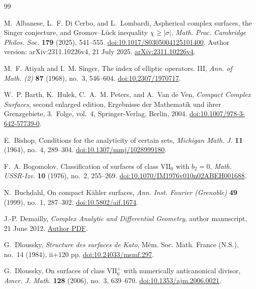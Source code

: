 \begin{thebibliography}{99}

M.~Albanese, L.~F. Di Cerbo, and L.~Lombardi,
Aspherical complex surfaces, the Singer conjecture, and Gromov--L\"uck
inequality $\chi\geq|\sigma|$,
\emph{Math. Proc. Cambridge Philos. Soc.} \textbf{179} (2025), 541--555.
\href{https://doi.org/10.1017/S0305004125101400}{doi:10.1017/S0305004125101400}.
Author version: arXiv:2311.10226v4, 21 July 2025.
\href{https://arxiv.org/abs/2311.10226v4}{arXiv:2311.10226v4}.

M.~F. Atiyah and I.~M. Singer, The index of elliptic operators. III,
\emph{Ann. of Math. (2)} \textbf{87} (1968), no.~3, 546--604.
\href{https://doi.org/10.2307/1970717}{doi:10.2307/1970717}.

W.~P. Barth, K.~Hulek, C.~A.~M. Peters, and A.~Van de Ven,
\emph{Compact Complex Surfaces}, second enlarged edition,
Ergebnisse der Mathematik und ihrer Grenzgebiete, 3.~Folge, vol.~4,
Springer-Verlag, Berlin, 2004.
\href{https://doi.org/10.1007/978-3-642-57739-0}{doi:10.1007/978-3-642-57739-0}.

E.~Bishop, Conditions for the analyticity of certain sets,
\emph{Michigan Math. J.} \textbf{11} (1964), no.~4, 289--304.
\href{https://doi.org/10.1307/mmj/1028999180}{doi:10.1307/mmj/1028999180}.

F.~A. Bogomolov, Classification of surfaces of class $\mathrm{VII}_0$
with $b_2=0$, \emph{Math. USSR-Izv.} \textbf{10} (1976), no.~2, 255--269.
\href{https://doi.org/10.1070/IM1976v010n02ABEH001688}{doi:10.1070/IM1976v010n02ABEH001688}.

N.~Buchdahl, On compact K\"ahler surfaces,
\emph{Ann. Inst. Fourier (Grenoble)} \textbf{49} (1999), no.~1, 287--302.
\href{https://doi.org/10.5802/aif.1674}{doi:10.5802/aif.1674}.

J.-P. Demailly, \emph{Complex Analytic and Differential Geometry},
author manuscript, 21 June 2012.
\href{https://www-fourier.univ-grenoble-alpes.fr/~demailly/manuscripts/agbook.pdf}{Author PDF}.

G.~Dloussky, \emph{Structure des surfaces de Kato},
M\'em. Soc. Math. France (N.S.), no.~14 (1984), ii+120 pp.
\href{https://doi.org/10.24033/msmf.297}{doi:10.24033/msmf.297}.

G.~Dloussky, On surfaces of class $\mathrm{VII}_0^+$ with numerically
anticanonical divisor, \emph{Amer. J. Math.} \textbf{128} (2006),
no.~3, 639--670.
\href{https://doi.org/10.1353/ajm.2006.0021}{doi:10.1353/ajm.2006.0021}.


\end{thebibliography}
